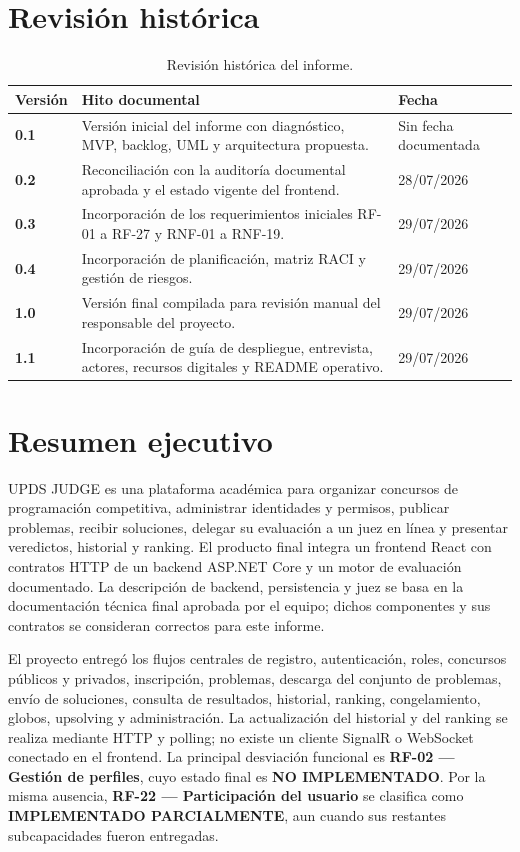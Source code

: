 \documentclass[11pt,a4paper]{article}
\newcommand{\statuspartial}{\textbf{IMPLEMENTADO PARCIALMENTE}\xspace}
\newcommand{\statusno}{\textbf{NO IMPLEMENTADO}\xspace}
\begin{document}
\section*{Revisión histórica}
\begin{table}[H]
\centering
\begin{tabularx}{\textwidth}{>{\bfseries}p{1.7cm}Xp{3.2cm}}
\toprule
Versión & Hito documental & Fecha \\
\midrule
0.1 & Versión inicial del informe con diagnóstico, MVP, backlog, UML y arquitectura propuesta. & Sin fecha documentada \\
0.2 & Reconciliación con la auditoría documental aprobada y el estado vigente del frontend. & 28/07/2026 \\
0.3 & Incorporación de los requerimientos iniciales RF-01 a RF-27 y RNF-01 a RNF-19. & 29/07/2026 \\
0.4 & Incorporación de planificación, matriz RACI y gestión de riesgos. & 29/07/2026 \\
1.0 & Versión final compilada para revisión manual del responsable del proyecto. & 29/07/2026 \\
1.1 & Incorporación de guía de despliegue, entrevista, actores, recursos digitales y README operativo. & 29/07/2026 \\
\bottomrule
\end{tabularx}
\caption{Revisión histórica del informe.}
\label{tab:revision-historica}
\end{table}

\section*{Resumen ejecutivo}
UPDS JUDGE es una plataforma académica para organizar concursos de programación competitiva, administrar identidades y permisos, publicar problemas, recibir soluciones, delegar su evaluación a un juez en línea y presentar veredictos, historial y ranking. El producto final integra un frontend React con contratos HTTP de un backend ASP.NET Core y un motor de evaluación documentado. La descripción de backend, persistencia y juez se basa en la documentación técnica final aprobada por el equipo; dichos componentes y sus contratos se consideran correctos para este informe.

El proyecto entregó los flujos centrales de registro, autenticación, roles, concursos públicos y privados, inscripción, problemas, descarga del conjunto de problemas, envío de soluciones, consulta de resultados, historial, ranking, congelamiento, globos, upsolving y administración. La actualización del historial y del ranking se realiza mediante HTTP y polling; no existe un cliente SignalR o WebSocket conectado en el frontend. La principal desviación funcional es \textbf{RF-02 --- Gestión de perfiles}, cuyo estado final es \statusno. Por la misma ausencia, \textbf{RF-22 --- Participación del usuario} se clasifica como \statuspartial, aun cuando sus restantes subcapacidades fueron entregadas.
\end{document}
